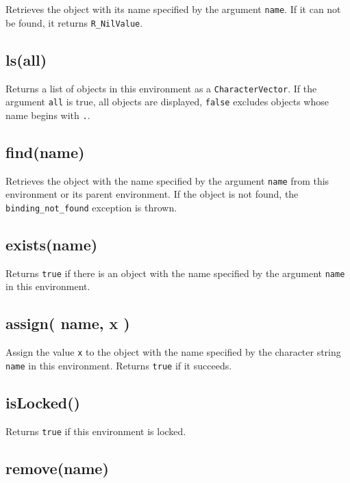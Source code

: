 \documentclass[
]{book}
\begin{document}
Retrieves the object with its name specified by the argument \texttt{name}. If it can not be found, it returns \texttt{R\_NilValue}.

\hypertarget{lsall}{%
\subsection{ls(all)}\label{lsall}}

Returns a list of objects in this environment as a \texttt{CharacterVector}. If the argument \texttt{all} is true, all objects are displayed, \texttt{false} excludes objects whose name begins with \texttt{.}.

\hypertarget{findname}{%
\subsection{find(name)}\label{findname}}

Retrieves the object with the name specified by the argument \texttt{name} from this environment or its parent environment. If the object is not found, the \texttt{binding\_not\_found} exception is thrown.

\hypertarget{existsname}{%
\subsection{exists(name)}\label{existsname}}

Returns \texttt{true} if there is an object with the name specified by the argument \texttt{name} in this environment.

\hypertarget{assign-name-x}{%
\subsection{assign( name, x )}\label{assign-name-x}}

Assign the value \texttt{x} to the object with the name specified by the character string \texttt{name} in this environment. Returns \texttt{true} if it succeeds.

\hypertarget{islocked}{%
\subsection{isLocked()}\label{islocked}}

Returns \texttt{true} if this environment is locked.

\hypertarget{removename}{%
\subsection{remove(name)}\label{removename}}
\end{document}
